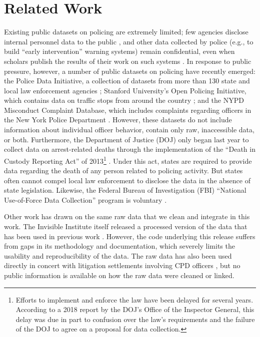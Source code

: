 \section{Related Work}\label{sec:related}
Existing public datasets on policing are extremely limited; 
few agencies disclose internal personnel data to the public \cite{Jackman21},
and other data collected by police (e.g., to build ``early intervention'' warning systems)
remain confidential, even when scholars publish the results of their 
work on such systems \cite{Helsby18}.
In response to public pressure, however, a number of
public datasets on policing have recently emerged: 
the Police Data Initiative, a collection of datasets from 
more than 130 state and local law enforcement agencies \cite{pdi};
Stanford University’s Open Policing Initiative, which contains
data on traffic stops from around the country \cite{sopp}; and
the NYPD Misconduct Complaint Database,
which includes complaints regarding officers in the New York Police Department \cite{nmcd}.
However, these datasets do not include information about individual officer behavior,
contain only raw, inaccessible data, or both.
Furthermore, the Department of Justice
(DOJ) only began last year to collect data on arrest-related deaths through the
implementation of the ``Death in Custody Reporting Act'' of 2013\footnote{Efforts to implement and enforce the law have been delayed for several years. According to a 2018 report by the DOJ’s Office of the Inspector General, this delay was due in part to confusion over the law’s requirements and the failure of the DOJ to agree on a proposal for data collection.} \cite{DICRA2013}. Under this act, states are required to provide data regarding
the death of any person related to policing activity. But states often cannot compel local
law enforcement to disclose the data in the absence of state legislation.
Likewise, the Federal Bureau of Investigation (FBI) ``National Use-of-Force
Data Collection'' program is voluntary \cite{Gardner2020}.

Other work has drawn on the same raw data that we clean and integrate in this
work. The Invisible Institute itself released a processed version of
the data that has been used in previous work \cite{invisdata,ba2021role}. However, the
code underlying this release suffers from gaps in its methodology
and documentation, which severely limits the usability and reproducibility of
the data. The raw data has also been used directly in concert with litigation
settlements involving CPD officers \cite{Rozema19}, but no public information
is available on how the raw data were cleaned or linked.
